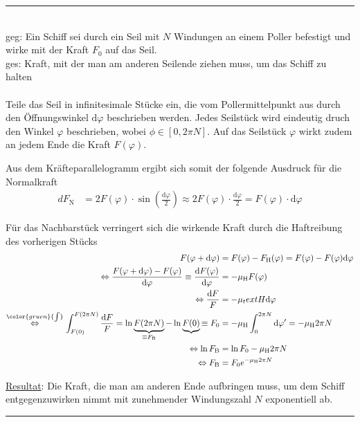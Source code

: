 \documentclass{article}
\newcommand{\diff}{\mathrm{d}}
\newcommand{\lr}[1]{\left(#1\right)}
\newcommand{\comment}[1]{{\color{gruen} {#1}}}
\begin{document}
\newpage


{\color{blue}
\hrule
	\\
	geg: Ein Schiff sei durch ein Seil mit $N$ Windungen an einem Poller befestigt und wirke mit der Kraft $F_0$ auf das Seil.\\
	ges: Kraft, mit der man am anderen Seilende ziehen muss, um das Schiff zu halten\\
	\\
	Teile das Seil in infinitesimale Stücke ein, die vom Pollermittelpunkt aus durch den Öffnungswinkel $\diff\varphi$ beschrieben werden. Jedes Seilstück wird eindeutig druch den Winkel $\varphi$ beschrieben, wobei $\phi\in[0,2\pi N]$. Auf das Seilstück $\varphi$ wirkt zudem an jedem Ende die Kraft $F(\varphi)$.

Aus dem Kräfteparallelogramm ergibt sich somit der folgende Ausdruck für die Normalkraft
	\begin{align*}
		dF_\text{N} &= 2 F(\varphi) \cdot \sin\lr{ \frac{\diff\varphi}{2} } \approx 2 F(\varphi) \cdot \frac{\diff\varphi}{2} = F(\varphi) \cdot \diff\varphi
	\end{align*}

Für das Nachbarstück verringert sich die wirkende Kraft durch die Haftreibung des vorherigen Stücks
	\begin{align*}
		F(\varphi + \diff\varphi) &= F(\varphi) - F_\text{H}(\varphi) = F(\varphi) - F(\varphi) \diff\varphi \\
		\Leftrightarrow \frac{F(\varphi + \diff\varphi) - F(\varphi)}{\diff\varphi} \equiv \frac{\diff F(\varphi)}{\diff\varphi} &= -\mu_\text{H} F(\varphi) \\
		\Leftrightarrow \frac{\diff F}{F} &= -\mu_text{H} \diff\varphi \\
		\stackrel{\comment{\int}}{\Leftrightarrow} \int_{F(0)}^{F(2\pi N)} \frac{\diff F}{F} = \ln \underbrace{ F(2\pi N) }_{\equiv F_\text{B}} - \ln \underbrace{F(0)}{\equiv F_0} &= -\mu_\text{H} \int_0^{2\pi N} \diff\varphi' = -\mu_\text{H} 2\pi N \\
		\Leftrightarrow \ln F_\text{B} &= \ln F_0 - \mu_\text{H} 2\pi N \\
		\Leftrightarrow F_\text{B} &= F_0 e^{-\mu_\text{H} 2\pi N}
	\end{align*}

\underline{Resultat}: Die Kraft, die man am anderen Ende aufbringen muss, um dem Schiff entgegenzuwirken nimmt mit zunehmender Windungszahl $N$ exponentiell ab.
\hrule
}


\newpage
\end{document}
